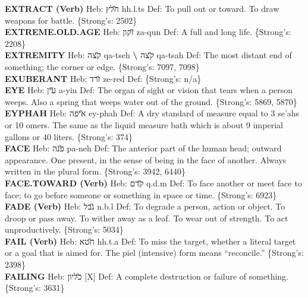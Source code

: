 {\textbf{EXTRACT (Verb)} Heb: {\large\H חלץ} hh.l.ts Def: To pull out or toward. To draw weapons for battle. \{Strong's: 2502\}\hfill{}\\

\textbf{EXTREME.OLD.AGE} Heb: {\large\H זקון} za-qun Def: A full and long life. \{Strong's: 2208\}\hfill{}\\

\textbf{EXTREMITY} Heb: {\large\H קצה} qa-tseh \textbf{\textbackslash{}} {\large\H קצה} qa-tsah Def: The most distant end of something; the corner or edge. \{Strong's: 7097, 7098\}\hfill{}\\

\textbf{EXUBERANT} Heb: {\large\H זרד} ze-red Def: \{Strong's: n/a\}\hfill{}\\

\textbf{EYE} Heb: {\large\H עין} a-yin Def: The organ of sight or vision that tears when a person weeps. Also a spring that weeps water out of the ground. \{Strong's: 5869, 5870\}\hfill{}\\

\textbf{EYPHAH} Heb: {\large\H איפה} ey-phah Def: A dry standard of measure equal to 3 se'ahs or 10 omers. The same as the liquid measure bath which is about 9 imperial gallons or 40 liters. \{Strong's: 374\}\hfill{}\\

\textbf{FACE} Heb: {\large\H פנה} pa-neh Def: The anterior part of the human head; outward appearance. One present, in the sense of being in the face of another. Always written in the plural form. \{Strong's: 3942, 6440\}\hfill{}\\

\textbf{FACE.TOWARD (Verb)} Heb: {\large\H קדם} q.d.m Def: To face another or meet face to face; to go before someone or something in space or time. \{Strong's: 6923\}\hfill{}\\

\textbf{FADE (Verb)} Heb: {\large\H נבל} n.b.l Def: To degrade a person, action or object. To droop or pass away. To wither away as a leaf. To wear out of strength. To act unproductively. \{Strong's: 5034\}\hfill{}\\

\textbf{FAIL (Verb)} Heb: {\large\H חטא} hh.t.a Def: To miss the target, whether a literal target or a goal that is aimed for. The piel (intensive) form means ``reconcile.'' \{Strong's: 2398\}\hfill{}\\

\textbf{FAILING} Heb: {\large\H כליון} {[}X{]} Def: A complete destruction or failure of something. \{Strong's: 3631\}\hfill{}\\

}
